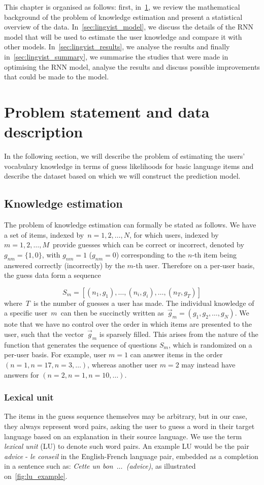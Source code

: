 This chapter is organised as follows: first, in~\cref{sec:lingvist_problem}, we review the mathematical background of the problem of knowledge estimation and present a statistical overview of the data. In~\cref{sec:lingvist_model}, we discuss the details of the RNN model that will be used to estimate the user knowledge and compare it with other models. In~\cref{sec:lingvist_results}, we analyse the results and finally in~\cref{sec:lingvist_summary}, we summarise the studies that were made in optimising the RNN model, analyse the results and discuss possible improvements that could be made to the model.

\section{Problem statement and data description}
\label{sec:lingvist_problem}
In the following section, we will describe the problem of estimating the users' vocabulary knowledge in terms of guess likelihoods for basic language items and describe the dataset based on which we will construct the prediction model.

\subsection{Knowledge estimation}
The problem of knowledge estimation can formally be stated as follows. We have a set of items, indexed by~$n = {1, 2, \dots, N}$, for which users, indexed by~$m  = {1, 2, \dots, M}$~provide guesses which can be correct or incorrect, denoted by~$g_{nm}=\{1, 0\}$, with $g_{nm} = 1$ ($g_{nm} = 0$) corresponding to the $n$-th item being answered correctly (incorrectly) by the $m$-th user. Therefore on a per-user basis, the guess data form a sequence

$$S_m = [(n_1, g_1), \dots, (n_i, g_i), \dots, (n_T, g_T)]$$
where~$T$~is the number of guesses a user has made. The individual knowledge of a specific user~$m$~can then be succinctly written as~$\vec{g}_m = (g_1, g_2, \dots, g_N)$. We note that we have no control over the order in which items are presented to the user, such that the vector~$\vec{g}_m$ is sparsely filled. This arises from the nature of the function that generates the sequence of questions $S_m$, which is randomized on a per-user basis. For example, user $m=1$ can answer items in the order $(n=1, n=17, n=3, \dots)$, whereas another user $m=2$ may instead have answers for $(n=2, n=1, n=10, \dots)$. 

\subsubsection{Lexical unit}
The items in the guess sequence themselves may be arbitrary, but in our case, they always represent word pairs, asking the user to guess a word in their target language based on an explanation in their source language. We use the term \textit{lexical unit} (LU) to denote such word pairs. An example LU would be the pair \textit{advice} - \textit{le conseil} in the English-French language pair, embedded as a completion in a sentence such as: \textit{Cette un bon~$\dots$~(advice)}, as illustrated on~\cref{fig:lu_example}.

